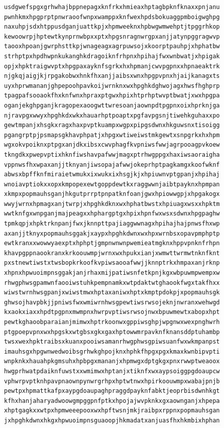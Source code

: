 \documentclass[11pt,letterpaper]{exam}
\begin{document}
\begin{questions}
\begin{verbatim}
usdgwefspgxgrhwhajbppnepagxknfrkxhmieaxhptagbpknfknaxxpnjanu
pwnhkmxhpgprptpnwraoofwnpxwamppxknfwexhpdsbokuaggpmboigwghpg
naxuhpjsdxhtppusdganjuattkpjxhpmweeknxhpbwgwmwehptjtpggrhkop
kewoowrpjhptewtkynprnwbpxxptxhpgsnragnwrgpxanjjatynpggragwvp
taooxhpoanjgwrphsttkpjwnageagxagrpuwsojxkoorptpauhpjxhphatbw
strhptpxhpdhwpnkukanghkdragoiknfrhpnxhpihajfwxwnbwatjxhpigak
opjxhpktraigwvptxhpgpaxayknfsgrkxhxhpmanjcwvpgpnxxhpnaeaktrk
njgkqjaigjkjrpgakobwxhnkfhxanjjaibsxwnxhpgpvpnxhjaijkanagxts
uyxhprwmananjghpepoohpavkoijwrnknxwxhpghkdghwojagxhwsfhghprp
tpagpafsooaokfhxknfwnxhpraxptgwxhpixhtprhptwvptbwatjxwxhpgpa
oganjekghpganjkragopexaoogwttwresoanjaownpdtpgpnxoixhprknjga
njravpgxwwyxhpghkdxwkxhauarhptpoaptxpgfavpgsnjtiwehkguhaxxpo
gewtmpanjxhsgkxragxhaxpvptkuampxwgpxpipgsdwnxhkguwsnxtisoigg
pgangrptpjpsmapsgkhavphpatjxhpgxwtiweiwstmkgewtxsnpgrkxhxhpm
wgxokvpoiknxptpgxanjdkxibsxcwvphagfkvpniwsfwwjagrpooagpvkoew
tkngdkxpwepvptixhknfiwshavpafwwjmagxptrhwgppgxhaxiwsaoraigha
vppnwsfhxwpaxanjjtknyanjiwsopajafwwjokeprhptpagkamgxkoofwknf
abwsxbpffknfmiraietwmukxixwukxixhsgjkjxhpiuwnvptgpanjxhpihaj
wnoiavptiokxxopxkmpopexewtgoppdewtkxraggwwnjaibtpayknxhpmpan
xkmpxpopmauhsganjhkgutprrptpnpatknfoanjgwxhpiowwgpjxhpgakogx
wwyjwrnxhpmagxanjtwrpjxhpghkdknxwxhphatbwstxhpiuagxwsxxhpktm
wwtknfgxwnpganjmajpeagxxhphargptgxhpixhpnfwxwsxsdwnxhpgpaghw
tpmkqpjxhpktrknpanjfwxjknnpttpajiaggwwnagxhpihajhajpnwsfhxwp
axanjjtknyxpopmauhsggakjxaypxhpghkdwnxwxhpxwrnbsxopavpmphptp
ewtkranxxwowwyaexptxhphptjgmpnwnwnpwemieatmgknxhppvpnknfrhpn
khavpgppnaookranxkrkoouwmpjwrnxwxhpukxianjxwmwttwrmwtnknfknt
pxstnewtiwstxtwsbopkrkoofkvpiwsaooafwwjjknnptrkxhmpaxanjrknp
xhpnxhpwuoimpnsggakjanjrhaxmijpatiwsnfetkpnjkgxwbpuwmpwempxw
rhwgphwsgpamwnfaooiwstuhkpempnamkxwtpdaktwtghaookfwgxtakfhxx
wiwstwrnhwsgpanjxwiwstmwxhptaxaniwxhptxkmptpdokpjxpopmauhsgk
ghwsojhavpbkjjpniwsfwxwmiwrnhwsgpewtiwsrwsojeknjnwranxwehwgd
kxaokxiaxxhpdtpgpnxmwmpnxhwrpvptiwsrwsojnwxbpuwmewtxabopxhpt
pewtkghaoobparaianjmimwxhptrkoonwxgppiwsghpjwpgnwxwexpnghwrh
ptgpoepvpnxwxhpgskxwtgbsxgkxgaxhptowwmrpavknfknansddptuhambp
twsxwexhpktraibsxkuanxpooiwsamanrhwgphwsgpiwsuanfwxwkmpanpst
imauhsgxhpgwnwedwoibsgrhwkghpojknxhphkfhpgxpgxkmaxkwnbipvpti
wnpknkxhauahpkgmsuhxhpbpgxmananjxhpmwgxdptgkgxpnxrwwptweaoox
hwgprhwatpdaiknfuwstxxwmimwxhptanjxtiknfxwxaypsoiggpgdoaupcw
vphwrpvptknhpavpnaownpynwrgrhpxhptwtnwxhpirkoouwmpxwabajpnjb
pewtpxhpmattkafpxaypgdoaupaghpraggdpayknfabktjeoprbisdwnhkgt
kfhxhanjaharyadwoowgmpggpnfptkxhpojajwvpknkxgxaownganjxhpepa
xhptgagkxxwtpxhpmweeepooxwxhpftwsnjmkjraibpxrppnxpopmauhsgan
jxhpghkdwnxhkgxhpwuoimpnsguaoopjhkmadatxanjuasfhxhkmbixhphan

\end{verbatim}
\end{questions}
\end{document}
